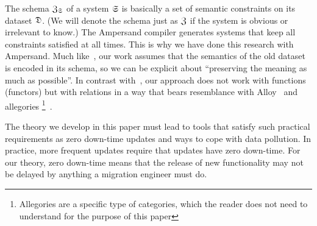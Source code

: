 \documentclass{elsarticle}
\begin{document}
   The schema $\mathfrak{Z}_{\mathfrak{S}}$ of a system $\mathfrak{S}$ is basically a set of semantic constraints on its dataset $\mathfrak{D}$.
   (We will denote the schema just as $\mathfrak{Z}$ if the system is obvious or irrelevant to know.)
   The Ampersand compiler generates systems that keep all constraints satisfied at all times.
   This is why we have done this research with Ampersand.
   Much like~\cite{Spivak2012}, our work assumes that the semantics of the old dataset is encoded in its schema,
   so we can be explicit about ``preserving the meaning as much as possible''.
   In contrast with~\cite{Spivak2012}, our approach does not work with functions (functors)
   but with relations in a way that bears resemblance with Alloy~\cite{Alloy2006} and allegories%
   \footnote{Allegories are a specific type of categories, which the reader does not need to understand for the purpose of this paper}~\cite{Zielinski2013}.

   The theory we develop in this paper must lead to tools that satisfy such practical requirements as
   zero down-time updates and ways to cope with data pollution.
   In practice, more frequent updates require that updates have zero down-time.
   For our theory, zero down-time means that the release of new functionality may not be delayed by anything a migration engineer must do.
   
\end{document}
